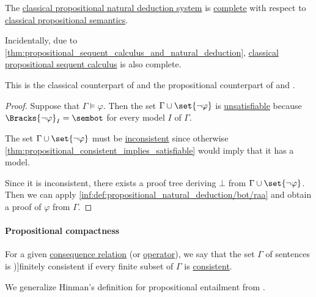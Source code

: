 \begin{theorem}\label{thm:classical_propositional_completeness}
  The \hyperref[def:propositional_natural_deduction]{classical propositional natural deduction system} is \hyperref[def:general_logic/completeness]{complete} with respect to \hyperref[def:propositional_semantics]{classical propositional semantics}.
\end{theorem}
\begin{comments}
  \item Incidentally, due to \cref{thm:propositional_sequent_calculus_and_natural_deduction}, \hyperref[def:classical_propositional_sequent_calculus]{classical propositional sequent calculus} is also complete.

  \item This is the classical counterpart of  and the propositional counterpart of  and .
\end{comments}
\begin{proof}
  Suppose that \( \Gamma \vDash \varphi \). Then the set \( \Gamma \cup \set{ \neg \varphi } \) is \hyperref[def:propositional_semantics/satisfaction]{unsatisfiable} because \( \Bracks{\neg \varphi}_I = \sembot \) for every model \( I \) of \( \Gamma \).

  The set \( \Gamma \cup \set{ \neg \varphi } \) must be \hyperref[def:propositional_theory/consistent]{inconsistent} since otherwise \cref{thm:propositional_consistent_implies_satisfiable} would imply that it has a model.

  Since it is inconsistent, there exists a proof tree deriving \( \bot \) from \( \Gamma \cup \set{ \neg \varphi } \). Then we can apply \ref{inf:def:propositional_natural_deduction/bot/raa} and obtain a proof of \( \varphi \) from \( \Gamma \).
\end{proof}

\paragraph{Propositional compactness}

\begin{definition}\label{def:finitely_consistent_set_of_sentences}\mimprovised
  For a given \hyperref[def:consequence_relation]{consequence relation} (or \hyperref[def:consequence_operator]{operator}), we say that the set \( \Gamma \) of sentences is \term[en=finitely consistent (set) (\cite[def. 1.4.21]{Hinman2005Logic})]{finitely consistent} if every finite subset of \( \Gamma \) is \hyperref[def:propositional_theory/consistent]{consistent}.
\end{definition}
\begin{comments}
  \item We generalize Hinman's definition for propositional entailment from \cite[def. 1.4.21]{Hinman2005Logic}.
\end{comments}

